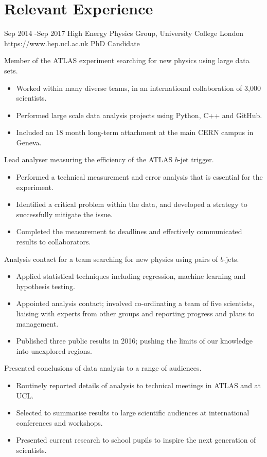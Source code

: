 \documentclass[10pt]{article} %
\begin{document}
\section{Relevant Experience}
\job
{Sep 2014 -}{Sep 2017}
{High Energy Physics Group, University College London}
{https://www.hep.ucl.ac.uk}
{PhD Candidate}
{
  \begin{itemize-noindent}
  \item{Member of the ATLAS experiment searching for new physics using large data sets.}
    \begin{itemize}
    \item{Worked within many diverse teams, in an international collaboration of 3,000 scientists.}
    \item{Performed large scale data analysis projects using Python, C++ and GitHub.}
    \item{Included an 18 month long-term attachment at the main CERN campus in Geneva.} 
    \end{itemize}
  \item{Lead analyser measuring the efficiency of the ATLAS $b$-jet trigger.}
    \begin{itemize}
    \item{Performed a technical measurement and error analysis that is essential for the experiment.}
    \item{Identified a critical problem within the data, and developed a strategy to successfully mitigate the issue.}
    \item{Completed the measurement to deadlines and effectively communicated results to collaborators.}
    \end{itemize}
  \item{Analysis contact for a team searching for new physics using pairs of $b$-jets.}
    \begin{itemize}
    \item{Applied statistical techniques including regression, machine learning and hypothesis testing.}
    \item{Appointed analysis contact; involved co-ordinating a team of five scientists,
      liaising with experts from other groups and reporting progress and plans to management.}
    \item{Published three public results in 2016; pushing the limits of our knowledge into unexplored regions.}
    \end{itemize}
 \item{Presented conclusions of data analysis to a range of audiences.}
   \begin{itemize}
   \item{Routinely reported details of analysis to technical meetings in ATLAS and at UCL.}
   \item{Selected to summarise results to large scientific audiences at international conferences and workshops.}
   \item{Presented current research to school pupils to inspire the next generation of scientists.}
   \end{itemize}
 \end{itemize-noindent}
}
\end{document}
